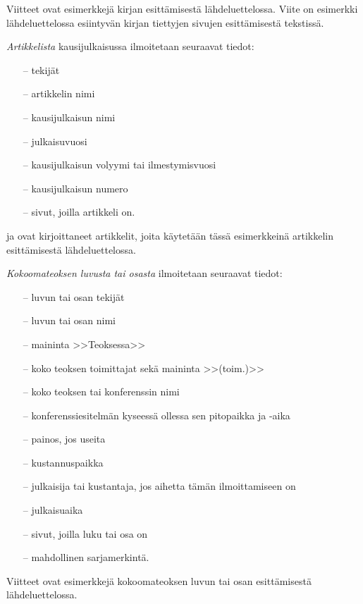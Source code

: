 \documentclass[english, 12pt, a4paper, sci, utf8, a-1b, online]{aaltothesis}
\begin{document}
Viitteet \citep{Kauranen,Koblitz} ovat esimerkkejä kirjan
esittämisestä lähdeluettelossa. Viite \citep[s.\ 83--124]{Koblitz} on
esimerkki lähdeluettelossa esiintyvän kirjan tiettyjen sivujen
esittämisestä tekstissä.

\textit{Artikkelista} kausijulkaisussa ilmoitetaan seuraavat tiedot:

\begin{itemize}

\item[--]tekijät
\item[--]artikkelin nimi
\item[--]kausijulkaisun nimi
\item[--]julkaisuvuosi
\item[--]kausijulkaisun volyymi tai ilmestymisvuosi
\item[--]kausijulkaisun numero
\item[--]sivut, joilla artikkeli on.
\end{itemize}

\citet{bcs} ja \citet{Deschamps} ovat kirjoittaneet artikkelit, joita käytetään tässä esimerkkeinä artikkelin esittämisestä lähdeluettelossa.

\textit{Kokoomateoksen luvusta tai osasta} ilmoitetaan seuraavat tiedot:

\begin{itemize}
\item[--]luvun tai osan tekijät
\item[--]luvun tai osan nimi
\item[--]maininta >>Teoksessa>>
\item[--]koko teoksen toimittajat sekä maininta >>(toim.)>>
\item[--]koko teoksen tai konferenssin nimi
\item[--]konferenssiesitelmän kyseessä ollessa sen pitopaikka ja -aika
\item[--]painos, jos useita
\item[--]kustannuspaikka
\item[--]julkaisija tai kustantaja, jos aihetta tämän ilmoittamiseen on
\item[--]julkaisuaika
\item[--]sivut, joilla luku tai osa on 
\item[--]mahdollinen sarjamerkintä.
\end{itemize}

Viitteet \citep{Sihvola,Lindblom} ovat esimerkkejä
kokoomateoksen luvun tai osan esittämisestä lähdeluettelossa. 
\end{document}
